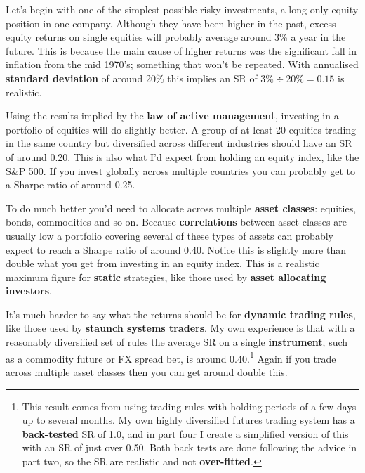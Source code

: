 Let's begin with one of the simplest possible risky investments, a long only equity position in one company. Although they have been higher in the past, excess equity returns on single equities will probably average around 3\% a year in the future. This is because the main cause of higher returns was the significant fall in inflation from the mid 1970's; something that won't be repeated. With annualised \textbf{standard deviation} of around 20\% this implies an SR of $3\% \div 20\% = 0.15$ is realistic.

Using the results implied by the \textbf{law of active management}, investing in a portfolio of equities will do slightly better. A group of at least 20 equities trading in the same country but diversified across different industries should have an SR of around 0.20. This is also what I'd expect from holding an equity index, like the S\&P 500. If you invest globally across multiple countries you can probably get to a Sharpe ratio of around 0.25.

To do much better you'd need to allocate across multiple \textbf{asset classes}: equities, bonds, commodities and so on. Because \textbf{correlations} between asset classes are usually low a portfolio covering several of these types of assets can probably expect to reach a Sharpe ratio of around 0.40. Notice this is slightly more than double what you get from investing in an equity index. This is a realistic maximum figure for \textbf{static} strategies, like those used by \textbf{asset allocating investors}.

It's much harder to say what the returns should be for \textbf{dynamic trading rules}, like those used by \textbf{staunch systems traders}. My own experience is that with a reasonably diversified set of rules the average SR on a single \textbf{instrument}, such as a commodity future or FX spread bet, is around 0.40.\footnote{This result comes from using trading rules with holding periods of a few days up to several months. My own highly diversified futures trading system has a \textbf{back-tested} SR of 1.0, and in part four I create a simplified version of this with an SR of just over 0.50. Both back tests are done following the advice in part two, so the SR are realistic and not \textbf{over-fitted}.} Again if you trade across multiple asset classes then you can get around double this.

